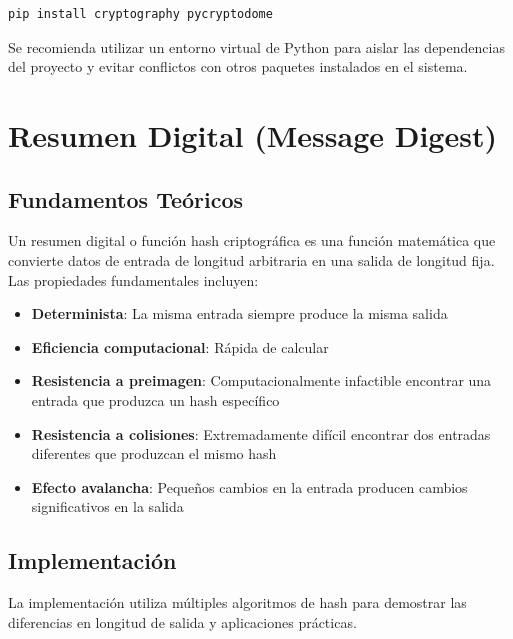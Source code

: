 \documentclass[12pt,a4paper]{article}
\begin{document}
\begin{lstlisting}[language=bash, caption=Instalación de bibliotecas requeridas]
pip install cryptography pycryptodome
\end{lstlisting}

\begin{securitygoodpractice}
	Se recomienda utilizar un entorno virtual de Python para aislar las dependencias del proyecto y evitar conflictos con otros paquetes instalados en el sistema.
\end{securitygoodpractice}

\newpage

\section{Resumen Digital (Message Digest)}

\subsection{Fundamentos Teóricos}

Un resumen digital o función hash criptográfica es una función matemática que
convierte datos de entrada de longitud arbitraria en una salida de longitud
fija. Las propiedades fundamentales incluyen:

\begin{itemize}
	\item \textbf{Determinista}: La misma entrada siempre produce la misma salida
	\item \textbf{Eficiencia computacional}: Rápida de calcular
	\item \textbf{Resistencia a preimagen}: Computacionalmente infactible encontrar una entrada que produzca un hash específico
	\item \textbf{Resistencia a colisiones}: Extremadamente difícil encontrar dos entradas diferentes que produzcan el mismo hash
	\item \textbf{Efecto avalancha}: Pequeños cambios en la entrada producen cambios significativos en la salida
\end{itemize}

\subsection{Implementación}

\begin{cryptomethod}
	La implementación utiliza múltiples algoritmos de hash para demostrar las diferencias en longitud de salida y aplicaciones prácticas.
\end{cryptomethod}
\end{document}
